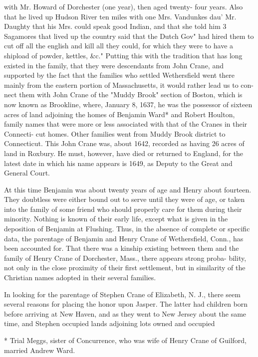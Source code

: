 \documentclass{book}
\begin{document}
with Mr. Howard of Dorchester (one year), then aged twenty- 
four years. Also that he lived up Hudson River ten miles 
with one Mrs. Vandunkes dau' Mr. Daughty that his Mrs. 
could speak good Indian, and that she told him 3 Sagamores that 
lived up the country said that the Dutch Gov" had hired them to 
cut off all the english and kill all they could, for which they were 
to have a shipload of powder, kettles, \&c." Putting this with 
the tradition that has long existed in the family, that they were 
descendants from John Crane, and supported by the fact that 
the families who settled Wethersfield went there mainly from the 
eastern portion of Massachusetts, it would rather lead us to con- 
nect them with John Crane of the "Muddy Brook" section of 
Boston, which is now known as Brookline, where, January 8, 1637, 
he was the possessor of sixteen acres of land adjoining the homes 
of Benjamin Ward* and Robert Houlton, family names that were 
more or less associated with that of the Cranes in their Connecti- 
cut homes. Other families went from Muddy Brook district to 
Connecticut. This John Crane was, about 1642, recorded as 
having 26 acres of land in Roxbury. He must, however, have 
died or returned to England, for the latest date in which his name 
appears is 1649, as Deputy to the Great and General Court. 

At this time Benjamin was about twenty years of age and 
Henry about fourteen. They doubtless were either bound out to 
serve until they were of age, or taken into the family of some 
friend who should properly care for them during their minority. 
Nothing is known of their early life, except what is given in the 
deposition of Benjamin at Flushing. Thus, in the absence of 
complete or specific data, the parentage of Benjamin and Henry 
Crane of Wethersfield, Conn., has been accounted for. That 
there was a kinship existing between them and the family of 
Henry Crane of Dorchester, Mass., there appears strong proba- 
bility, not only in the close proximity of their first settlement, but 
in similarity of the Christian names adopted in their several 
families. 

In looking for the parentage of Stephen Crane of Elizabeth, 
N. J., there seem several reasons for placing the honor upon 
Jasper. The latter had children born before arriving at New 
Haven, and as they went to New Jersey about the same time, 
and Stephen occupied lands adjoining lots owned and occupied 

* Trial Meggs, sister of Concurrence, who was wife of Henry Crane 
of Guilford, married Andrew Ward. 
\end{document}
